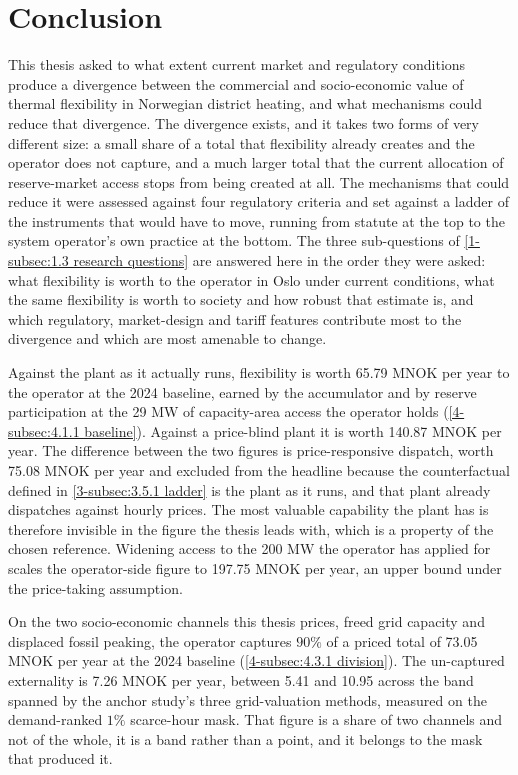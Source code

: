 \section{Conclusion}
\label{6-sec:6 conclusion}

This thesis asked to what extent current market and regulatory conditions produce a divergence between the commercial and socio-economic value of thermal flexibility in Norwegian district heating, and what mechanisms could reduce that divergence. The divergence exists, and it takes two forms of very different size: a small share of a total that flexibility already creates and the operator does not capture, and a much larger total that the current allocation of reserve-market access stops from being created at all. The mechanisms that could reduce it were assessed against four regulatory criteria and set against a ladder of the instruments that would have to move, running from statute at the top to the system operator's own practice at the bottom. The three sub-questions of \autoref{1-subsec:1.3 research questions} are answered here in the order they were asked: what flexibility is worth to the operator in Oslo under current conditions, what the same flexibility is worth to society and how robust that estimate is, and which regulatory, market-design and tariff features contribute most to the divergence and which are most amenable to change.

Against the plant as it actually runs, flexibility is worth 65.79 MNOK per year to the operator at the 2024 baseline, earned by the accumulator and by reserve participation at the 29 MW of capacity-area access the operator holds (\autoref{4-subsec:4.1.1 baseline}). Against a price-blind plant it is worth 140.87 MNOK per year. The difference between the two figures is price-responsive dispatch, worth 75.08 MNOK per year and excluded from the headline because the counterfactual defined in \autoref{3-subsec:3.5.1 ladder} is the plant as it runs, and that plant already dispatches against hourly prices. The most valuable capability the plant has is therefore invisible in the figure the thesis leads with, which is a property of the chosen reference. Widening access to the 200 MW the operator has applied for scales the operator-side figure to 197.75 MNOK per year, an upper bound under the price-taking assumption.

On the two socio-economic channels this thesis prices, freed grid capacity and displaced fossil peaking, the operator captures $90\%$ of a priced total of 73.05 MNOK per year at the 2024 baseline (\autoref{4-subsec:4.3.1 division}). The un-captured externality is 7.26 MNOK per year, between 5.41 and 10.95 across the band spanned by the anchor study's three grid-valuation methods, measured on the demand-ranked $1\%$ scarce-hour mask. That figure is a share of two channels and not of the whole, it is a band rather than a point, and it belongs to the mask that produced it.

